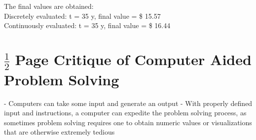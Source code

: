 \documentclass[10pt]{report}
\begin{document}
    The final values are obtained:\\
    Discretely evaluated: t  = 35 y, final value = \$ 15.57\\
    Continuously evaluated: t = 35 y, final value = \$ 16.44
    
    \section*{$\frac{1}{2}$ Page Critique of Computer Aided Problem Solving}

    - Computers can take some input and generate an output
    - With properly defined input and instructions, a computer can expedite the problem solving process, as sometimes problem solving requires one to obtain numeric values or visualizations that are otherwise extremely tedious
    
\end{document}
